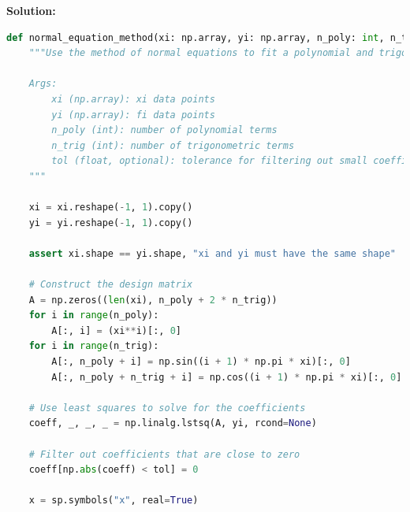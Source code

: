 \documentclass[conference,onecolumn]{IEEEtran}
\begin{document}
\begin{enumerate}

            \textbf{Solution:}
            \begin{lstlisting}[language=Python]
def normal_equation_method(xi: np.array, yi: np.array, n_poly: int, n_trig: int, tol: float = 1e-5):
    """Use the method of normal equations to fit a polynomial and trigonometric function to the data.

    Args:
        xi (np.array): xi data points
        yi (np.array): fi data points
        n_poly (int): number of polynomial terms
        n_trig (int): number of trigonometric terms
        tol (float, optional): tolerance for filtering out small coefficients. Defaults to 1e-5.
    """

    xi = xi.reshape(-1, 1).copy()
    yi = yi.reshape(-1, 1).copy()

    assert xi.shape == yi.shape, "xi and yi must have the same shape"

    # Construct the design matrix
    A = np.zeros((len(xi), n_poly + 2 * n_trig))
    for i in range(n_poly):
        A[:, i] = (xi**i)[:, 0]
    for i in range(n_trig):
        A[:, n_poly + i] = np.sin((i + 1) * np.pi * xi)[:, 0]
        A[:, n_poly + n_trig + i] = np.cos((i + 1) * np.pi * xi)[:, 0]

    # Use least squares to solve for the coefficients
    coeff, _, _, _ = np.linalg.lstsq(A, yi, rcond=None)

    # Filter out coefficients that are close to zero
    coeff[np.abs(coeff) < tol] = 0

    x = sp.symbols("x", real=True)


\end{lstlisting}
\end{enumerate}
\end{document}
